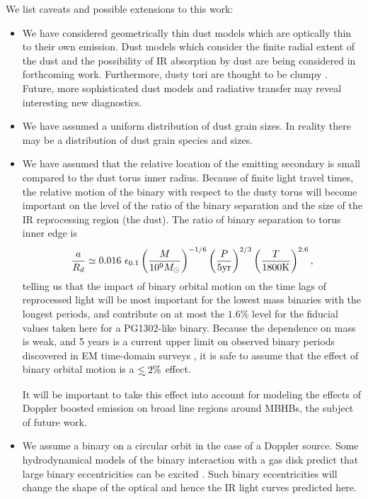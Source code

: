 We list caveats and possible extensions to this work: 
\begin{itemize}

\item We have considered geometrically thin dust models which are optically
thin to their own emission. Dust models which consider the finite radial
extent of the dust and the possibility of IR absorption by dust are being
considered in forthcoming work. Furthermore, dusty tori are thought to be
clumpy \citep[\textit{e.g}][and references therein]{Netzer:2015:rev}. Future,
more sophisticated dust models and radiative transfer may reveal interesting
new diagnostics.



\item We have assumed a uniform distribution of dust grain sizes.  In reality
there may be a distribution of dust grain species and sizes.


\item 
We have assumed that the relative location of the emitting secondary is small
compared to the dust torus inner radius. Because of finite light travel times,
the relative motion of the binary with respect to the dusty torus will become
important on the level of the ratio of the binary separation and the size of
the IR reprocessing region (the dust). The ratio of binary separation to
torus inner edge is
\begin{equation}
\frac{a}{R_d} \simeq 0.016\ \epsilon_{0.1} \left(\frac{M}{10^9 {M_{\odot}}}\right)^{-1/6}  \left(\frac{P}{5 \rm{yr}}\right)^{2/3}  \left(\frac{T}{1800 \rm{K}}\right)^{2.6},
\label{Eq:aORd}
\end{equation}
telling us that the impact of binary orbital motion on the time lags of
reprocessed light will be most important for the lowest mass binaries with the
longest periods, and contribute on at most the $1.6 \%$ level for the
fiducial values taken here for a PG1302-like binary. Because the dependence on
mass is weak, and 5 years is a current upper limit on observed binary periods
discovered in EM time-domain surveys \citep[\textit{e.g.}][]{Graham+2015b}, it
is safe to assume that the effect of binary orbital motion is a $\lsim 2\%$
effect.

It will be important to take this effect into account for modeling the effects
of Doppler boosted emission on broad line regions around MBHBs, the subject of
future work.


\item We assume a binary on a circular orbit in the case of a Doppler source.
Some hydrodynamical models of the binary interaction with a gas disk predict
that large binary eccentricities can be excited \citep{Roedig:2011:eccevo}.
Such binary eccentricities will change the shape of the optical and hence the
IR light curves predicted here.






\end{itemize}
